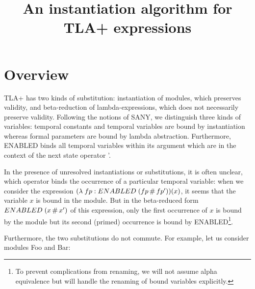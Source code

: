 \documentclass[a4paper]{article}
\title{An instantiation algorithm for TLA+ expressions}
\author{}
\newcommand{\tlaplus}[0]{{TLA+}}
\newcommand{\tla}[1]{#1}
\begin{document}
\maketitle

\section{Overview}
\label{sec:overview}
\tlaplus{} has two kinds of substitution: instantiation of modules, which
preserves validity, and beta-reduction of lambda-expressions, which does not
necessarily preserve validity. Following the notions of SANY, we distinguish
three kinds of variables: temporal constants and temporal variables are
bound by instantiation whereas formal parameters are bound by lambda
abstraction. Furthermore, ENABLED binds all temporal variables within its
argument which are in the context of the next state operator '.

In the presence of unresolved instantiations or substitutions, it is often
unclear, which operator binds the occurrence of a particular temporal variable:
when we consider the expression
\tla{$(\lambda\; fp : ENABLED\; (fp \,\#\, fp'))(x)$}, it seems that the variable
$x$ is bound in the module. But in the beta-reduced form $ENABLED\; (x \,\#\, x')$
of this expression, only the first occurrence of $x$ is bound by the
module but its second (primed) occurrence is bound by ENABLED\footnote{To
  prevent complications from renaming, we will not assume alpha equivalence but
  will handle the renaming of bound variables explicitly.}.

Furthermore, the two substitutions do not commute. For example, let us
consider modules Foo and Bar:

\begin{parcolumns}{2}
\end{parcolumns}
\end{document}
